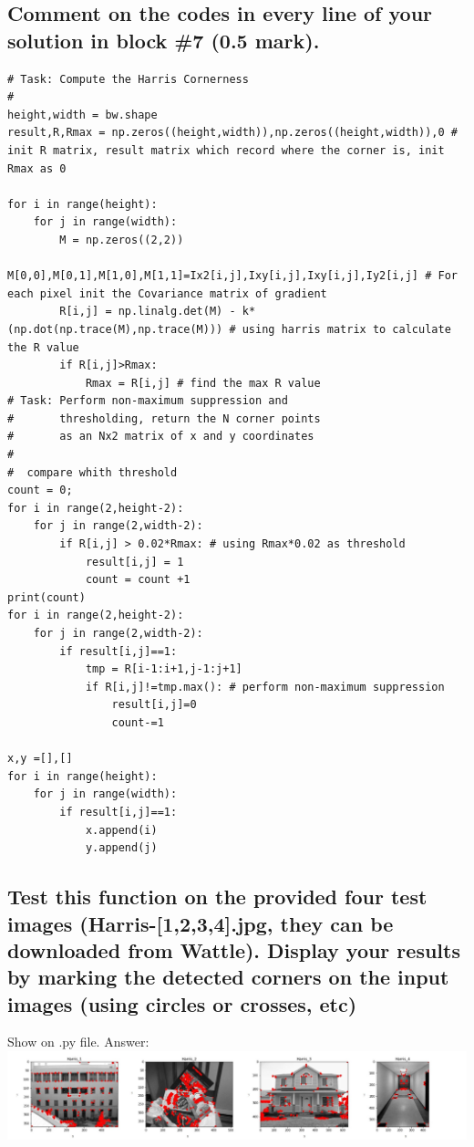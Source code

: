 \documentclass[]{article}
\begin{document}
\subsection{Comment on the codes in every line of your solution in block \#7 (0.5 mark).}
\begin{lstlisting}
# Task: Compute the Harris Cornerness
#
height,width = bw.shape
result,R,Rmax = np.zeros((height,width)),np.zeros((height,width)),0 # init R matrix, result matrix which record where the corner is, init Rmax as 0

for i in range(height):
	for j in range(width):
		M = np.zeros((2,2))
		M[0,0],M[0,1],M[1,0],M[1,1]=Ix2[i,j],Ixy[i,j],Ixy[i,j],Iy2[i,j] # For each pixel init the Covariance matrix of gradient
		R[i,j] = np.linalg.det(M) - k*(np.dot(np.trace(M),np.trace(M))) # using harris matrix to calculate the R value
		if R[i,j]>Rmax:
			Rmax = R[i,j] # find the max R value
# Task: Perform non-maximum suppression and
#       thresholding, return the N corner points
#       as an Nx2 matrix of x and y coordinates
#
#  compare whith threshold
count = 0;
for i in range(2,height-2):
	for j in range(2,width-2):
		if R[i,j] > 0.02*Rmax: # using Rmax*0.02 as threshold
			result[i,j] = 1
			count = count +1
print(count)
for i in range(2,height-2):
	for j in range(2,width-2):
		if result[i,j]==1:
			tmp = R[i-1:i+1,j-1:j+1]
			if R[i,j]!=tmp.max(): # perform non-maximum suppression
				result[i,j]=0
				count-=1

x,y =[],[]
for i in range(height):
	for j in range(width):
		if result[i,j]==1:
			x.append(i)
			y.append(j)
\end{lstlisting}

\subsection{Test this function on the provided four test images (Harris-[1,2,3,4].jpg, they can be downloaded from Wattle). Display your results by marking the detected corners on the input images (using circles or crosses, etc)}
Show on .py file.
Answer:\\
\includegraphics[width=15cm]{fig1.jpg}
\end{document}
